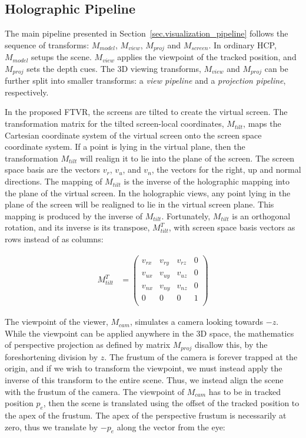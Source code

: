 \subsection{Holographic Pipeline}
\label{sec.holographic_pipeline}

The main pipeline presented in Section~\ref{sec.visualization_pipeline} follows the sequence of transforms: $M_{model}$, $M_{view}$, $M_{proj}$ and $M_{screen}$. In ordinary HCP, $M_{model}$ setups the scene. $M_{view}$ applies the viewpoint of the tracked position, and $M_{proj}$ sets the depth cues. The 3D viewing transforms, $M_{view}$ and $M_{proj}$ can be further split into smaller transforms: a \emph{view pipeline} and  a \emph{projection pipeline}, respectively.

In the proposed FTVR, the screens are tilted to create the virtual screen. The transformation matrix for the tilted screen-local coordinates, $M_{tilt}$, maps the Cartesian coordinate system of the virtual screen onto the screen space coordinate system. If a point is lying in the virtual plane, then the transformation $M_{tilt}$ will realign it to lie into the plane of the screen. The screen space basis are the vectors $v_r$, $v_u$, and $v_n$, the vectors for the right, up and normal directions. The mapping of $M_{tilt}$ is the inverse of the holographic mapping into the plane of the virtual screen. In the holographic views, any point lying in the plane of the screen will be realigned to lie in the virtual screen plane. This mapping is produced by the inverse of $M_{tilt}$. Fortunately, $M_{tilt}$ is an orthogonal rotation, and its inverse is its transpose, $M_{tilt}^{T}$, with screen space basis vectors as rows instead of as columns:

\begin{equation}
\begin{aligned}
M_{tilt}^{T} &= 
\begin{pmatrix} 
v_{rx} & v_{ry} & v_{rz} & 0\\
v_{ux} & v_{uy} & v_{uz} & 0\\
v_{nx} & v_{ny} & v_{nz} & 0\\
0      & 0      & 0      & 1\\
\end{pmatrix}
\end{aligned}
\label{eq.tilt_matrix_transpose}
\end{equation}

The viewpoint of the viewer, $M_{cam}$, simulates a camera looking towards $-z$. While the viewpoint can be applied anywhere in the 3D space, the mathematics of perspective projection as defined by matrix $M_{proj}$ disallow this, by the foreshortening division by $z$. The frustum of the camera is forever trapped at the origin, and if we wish to transform the viewpoint, we must instead apply the inverse of this transform to the entire scene. Thus, we instead align the scene with the frustum of the camera. The viewpoint of $M_{cam}$ has to be in tracked position $p_e$, then the scene is translated using the offset of the tracked position to the apex of the frustum. The apex of the perspective frustum is necessarily at zero, thus we translate by $-p_e$ along the vector from the eye:

